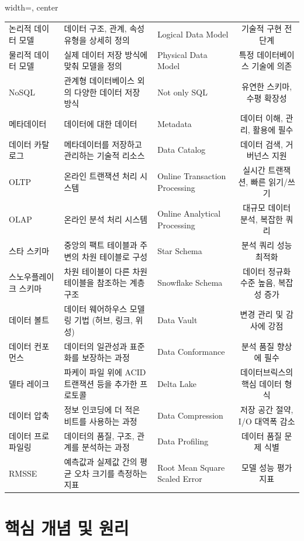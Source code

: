 \documentclass[11pt,a4paper]{article}
\theoremstyle{definition}
\begin{document}
\begin{table}[h!]
\begin{adjustbox}{width=\textwidth, center}
\begin{tabular}{lllc}
논리적 데이터 모델 & 데이터 구조, 관계, 속성 유형을 상세히 정의 & Logical Data Model & 기술적 구현 전 단계 \\
물리적 데이터 모델 & 실제 데이터 저장 방식에 맞춰 모델을 정의 & Physical Data Model & 특정 데이터베이스 기술에 의존 \\
NoSQL & 관계형 데이터베이스 외의 다양한 데이터 저장 방식 & Not only SQL & 유연한 스키마, 수평 확장성 \\
메타데이터 & 데이터에 대한 데이터 & Metadata & 데이터 이해, 관리, 활용에 필수 \\
데이터 카탈로그 & 메타데이터를 저장하고 관리하는 기술적 리소스 & Data Catalog & 데이터 검색, 거버넌스 지원 \\
OLTP & 온라인 트랜잭션 처리 시스템 & Online Transaction Processing & 실시간 트랜잭션, 빠른 읽기/쓰기 \\
OLAP & 온라인 분석 처리 시스템 & Online Analytical Processing & 대규모 데이터 분석, 복잡한 쿼리 \\
스타 스키마 & 중앙의 팩트 테이블과 주변의 차원 테이블로 구성 & Star Schema & 분석 쿼리 성능 최적화 \\
스노우플레이크 스키마 & 차원 테이블이 다른 차원 테이블을 참조하는 계층 구조 & Snowflake Schema & 데이터 정규화 수준 높음, 복잡성 증가 \\
데이터 볼트 & 데이터 웨어하우스 모델링 기법 (허브, 링크, 위성) & Data Vault & 변경 관리 및 감사에 강점 \\
데이터 컨포먼스 & 데이터의 일관성과 표준화를 보장하는 과정 & Data Conformance & 분석 품질 향상에 필수 \\
델타 레이크 & 파케이 파일 위에 ACID 트랜잭션 등을 추가한 프로토콜 & Delta Lake & 데이터브릭스의 핵심 데이터 형식 \\
데이터 압축 & 정보 인코딩에 더 적은 비트를 사용하는 과정 & Data Compression & 저장 공간 절약, I/O 대역폭 감소 \\
데이터 프로파일링 & 데이터의 품질, 구조, 관계를 분석하는 과정 & Data Profiling & 데이터 품질 문제 식별 \\
RMSSE & 예측값과 실제값 간의 평균 오차 크기를 측정하는 지표 & Root Mean Square Scaled Error & 모델 성능 평가 지표 \\
\bottomrule
\end{tabular}
\end{adjustbox}
\end{table}

\newpage
\section{핵심 개념 및 원리}
\end{document}
